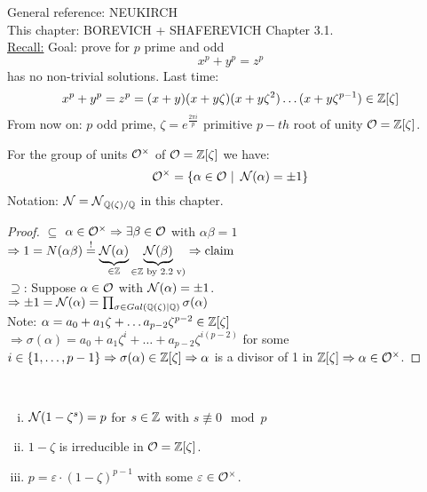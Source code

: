General reference: NEUKIRCH\\
This chapter: BOREVICH + SHAFEREVICH Chapter 3.1.\\

\underline{Recall:} Goal: prove for $p$ prime and odd 
\[x^p+y^p=z^p\]
has no non-trivial solutions.
Last time:
\[x^p+y^p=z^p=(x+y)(x+y\zeta)(x+y\zeta^2)\dots (x+y\zeta^{p-1}) \in \mathbb{Z}[\zeta]\]
From now on: $p$ odd prime, $\zeta = e^{\frac{2\pi i}{p}}$ primitive $p-th$ root of unity $\mathcal{O}= \mathbb{Z}[\zeta]$.

\begin{Prop}
For the group of units $\mathcal{O}^\times$ of $\mathcal{O}=\mathbb{Z}[\zeta]$ we have:
\[ \mathcal{O}^\times = \{ \alpha \in \mathcal{O} \ | \ \operatorname{\mathcal{N}}(\alpha) = \pm 1\}\]
Notation: $\operatorname{\mathcal{N}}=\operatorname{\mathcal{N}}_{\mathbb{Q}(\zeta) / \mathbb{Q}}$ in this chapter.
\end{Prop}
\begin{proof}
\glqq $\subseteq$ \grqq $\alpha \in \mathcal{O}^\times \Rightarrow \exists \beta \in \mathcal{O}$ with $\alpha\beta=1$
$\Rightarrow 1 = N(\alpha\beta) \stackrel{!}{=} \underbrace{\operatorname{\mathcal{N}}(\alpha)}_{\in \mathbb{Z}} \underbrace{\operatorname{\mathcal{N}}(\beta)}_{\in \mathbb{Z} \text{ by 2.2 v)}} \Rightarrow \text{claim}$\\
\glqq $\supseteq$\grqq: Suppose $\alpha \in \mathcal{O}$ with $\operatorname{\mathcal{N}}(\alpha) = \pm 1$.\\
$\Rightarrow \pm 1 = \operatorname{\mathcal{N}}(\alpha) = \prod_{\sigma \in Gal(\mathbb{Q}(\zeta)| \mathbb{Q})} \sigma(\alpha)$\\
Note: $\alpha = a_0 + a_1 \zeta + \dots a_{p-2} \zeta^{p-2} \in \mathbb{Z}[\zeta]$\\
$\Rightarrow \sigma(\alpha)=a_0+a_1\zeta^i + \dots + a_{p-2}\zeta^{i(p-2)}$ for some $i \in \{1, \dots, p-1\} \Rightarrow \sigma(\alpha) \in \mathbb{Z}[\zeta] \\
\Rightarrow \alpha$ is a divisor of 1 in $\mathbb{Z}[\zeta] \Rightarrow \alpha \in \mathcal{O}^\times$.
\end{proof}

\begin{Lem}\ \vspace*{-\baselineskip}
\begin{enumerate}[i)]
\item $\operatorname{\mathcal{N}}(1-\zeta^s) = p$ for $s \in \mathbb{Z}$ with $s \not\equiv 0 \mod p$
\item $1- \zeta$ is irreducible in $\mathcal{O}=\mathbb{Z}[\zeta]$.
\item $p= \varepsilon \cdot(1-\zeta)^{p-1}$ with some $\varepsilon \in \mathcal{O}^\times$.
\end{enumerate}
\end{Lem}

